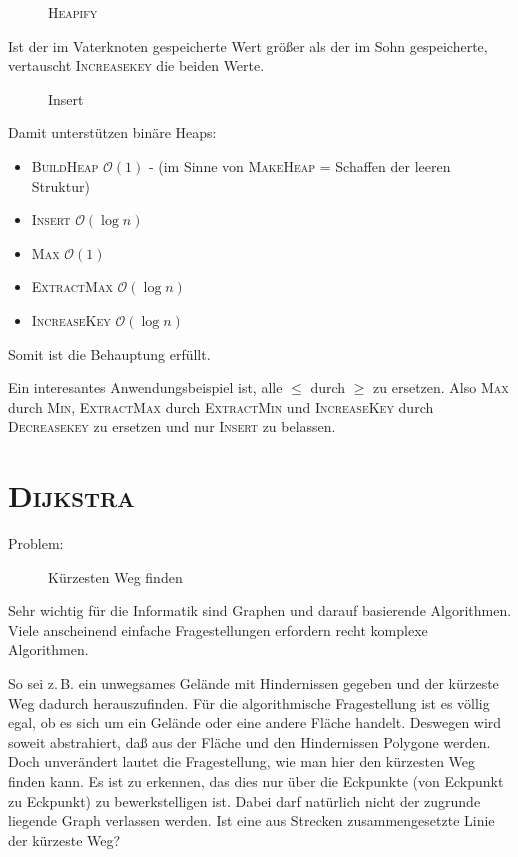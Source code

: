 \documentclass[ngerman,draft,parskip=half*,twoside]{scrreprt}
\theoremstyle{break}
\theoremstyle{nonumberbreak}
\newcommand*{\OO}{\mathcal{O}}      %
\begin{document}
\begin{figure}[H]
  \centering
  \caption{\textsc{Heapify}}
  \label{121103a}
\end{figure}
Ist der im Vaterknoten gespeicherte Wert größer als der im Sohn gespeicherte, vertauscht  \textsc{Increasekey} die beiden Werte.

\begin{figure}[H]
  \centering
  \caption{Insert}
  \label{121103b}
\end{figure}

Damit unterstützen binäre Heaps:
\begin{itemize}
\item \textsc{BuildHeap} $\OO(1)$ - (im Sinne von \textsc{MakeHeap} = Schaffen der leeren Struktur)
\item \textsc{Insert} $\OO(\log n)$
\item \textsc{Max} $\OO(1)$
\item \textsc{ExtractMax} $\OO(\log n)$
\item \textsc{IncreaseKey} $\OO(\log n)$
\end{itemize}
Somit ist die Behauptung erfüllt.

Ein interesantes Anwendungsbeispiel ist, alle $\leq$ durch $\geq$ zu ersetzen. Also \textsc{Max} durch \textsc{Min},
\textsc{ExtractMax} durch \textsc{ExtractMin} und \textsc{IncreaseKey} durch \textsc{Decreasekey} zu ersetzen und nur \textsc{Insert}
zu belassen.

\section{\textsc{Dijkstra}}

 Problem:
\begin{figure}[H]
  \centering
  \caption{Kürzesten Weg finden}
  \label{121103c}
\end{figure}

Sehr wichtig für die Informatik sind Graphen und darauf basierende Algorithmen. Viele anscheinend einfache Fragestellungen erfordern
recht komplexe Algorithmen.

So sei z.\,B. ein unwegsames Gelände mit Hindernissen gegeben und der kürzeste Weg dadurch herauszufinden. Für die algorithmische
Fragestellung ist es völlig egal, ob es sich um ein Gelände oder eine andere Fläche handelt. Deswegen wird soweit abstrahiert, daß
aus der Fläche und den Hindernissen Polygone werden. Doch unverändert lautet die Fragestellung, wie man hier den kürzesten Weg
finden kann. Es ist zu erkennen, das dies nur über die Eckpunkte (von Eckpunkt zu Eckpunkt)
zu bewerkstelligen ist. Dabei darf natürlich nicht der zugrunde liegende Graph verlassen werden. Ist eine aus Strecken zusammengesetzte
Linie der kürzeste Weg?
\end{document}
